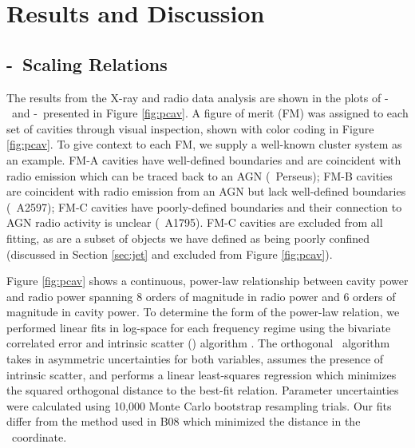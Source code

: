 \documentclass{emulateapj}
\begin{document}
\section{Results and Discussion}
\label{sec:r&d}

\subsection{\pjet-\prad\ Scaling Relations}
\label{sec:relation}

The results from the X-ray and radio data analysis are shown in the
plots of \pcav-\phigh\ and \pcav-\plow\ presented in Figure
\ref{fig:pcav}. A figure of merit (FM) was assigned to each set of
cavities through visual inspection, shown with color coding in Figure
\ref{fig:pcav}. To give context to each FM, we supply a well-known
cluster system as an example. FM-A cavities have well-defined
boundaries and are coincident with radio emission which can be traced
back to an AGN (\eg\ Perseus); FM-B cavities are coincident with radio
emission from an AGN but lack well-defined boundaries (\eg\ A2597);
FM-C cavities have poorly-defined boundaries and their connection to
AGN radio activity is unclear (\eg\ A1795). FM-C cavities are excluded
from all fitting, as are a subset of objects we have defined as being
poorly confined (discussed in Section \ref{sec:jet} and excluded from
Figure \ref{fig:pcav}).

Figure \ref{fig:pcav} shows a continuous, power-law relationship
between cavity power and radio power spanning 8 orders of magnitude in
radio power and 6 orders of magnitude in cavity power. To determine
the form of the power-law relation, we performed linear fits in
log-space for each frequency regime using the bivariate correlated
error and intrinsic scatter (\bces) algorithm \citep{bces}. The
orthogonal \bces\ algorithm takes in asymmetric uncertainties for both
variables, assumes the presence of intrinsic scatter, and performs a
linear least-squares regression which minimizes the squared orthogonal
distance to the best-fit relation. Parameter uncertainties were
calculated using 10,000 Monte Carlo bootstrap resampling trials. Our
fits differ from the method used in B08 which minimized the distance
in the \pcav\ coordinate.
\end{document}
